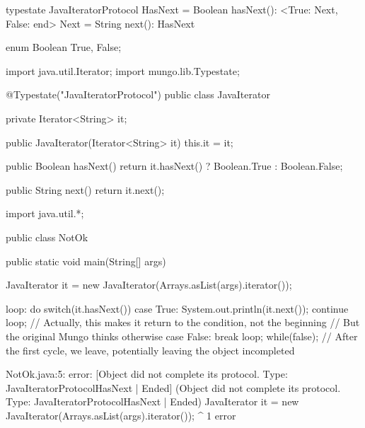 \begin{code}
typestate JavaIteratorProtocol {
  HasNext = {
    Boolean hasNext(): <True: Next, False: end>
  }
  Next = {
    String next(): HasNext
  }
}\end{code}

\begin{code}
enum Boolean {
	True, False;
}\end{code}

\begin{code}
import java.util.Iterator;
import mungo.lib.Typestate;

@Typestate("JavaIteratorProtocol")
public class JavaIterator {

  private Iterator<String> it;

  public JavaIterator(Iterator<String> it) {
    this.it = it;
  }

	public Boolean hasNext() {
    return it.hasNext() ? Boolean.True : Boolean.False;
  }

  public String next() {
    return it.next();
  }

}\end{code}

\begin{code}
import java.util.*;

public class NotOk {
	public static void main(String[] args) {
		JavaIterator it = new JavaIterator(Arrays.asList(args).iterator());

    loop: do {
      switch(it.hasNext()) {
        case True:
          System.out.println(it.next());
          continue loop; // Actually, this makes it return to the condition, not the beginning
          // But the original Mungo thinks otherwise
        case False:
          break loop;
      }
    } while(false); // After the first cycle, we leave, potentially leaving the object incompleted
	}
}\end{code}

\lstset{caption=Original Mungo output}
\begin{code}
\end{code}

\lstset{caption=New Mungo output}
\begin{code}
NotOk.java:5: error: [Object did not complete its protocol. Type: JavaIteratorProtocol{HasNext} | Ended] (Object did not complete its protocol. Type: JavaIteratorProtocol{HasNext} | Ended)
		JavaIterator it = new JavaIterator(Arrays.asList(args).iterator());
		             ^
1 error
\end{code}

